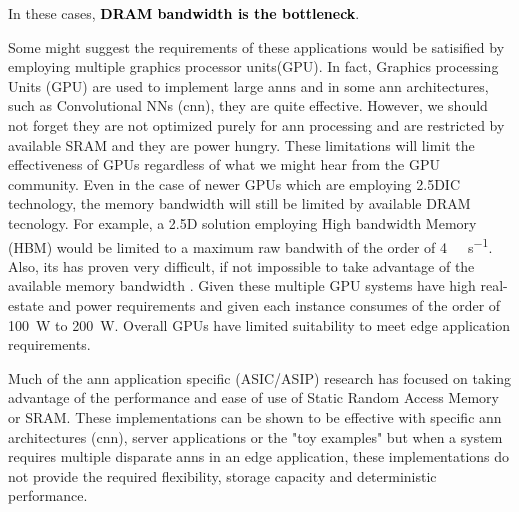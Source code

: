 In these cases, \textbf{\textcolor{black}{DRAM bandwidth is the bottleneck}}.




\iffalse
So considering the performance improvements observed in other applications, it is expected that many customer facing or edge applications will implement multiple instances of artificial neural networks to perform various functions.
have very large memory and processing requirements.
require multiple instances of \ac{ann}s of similar size to the \ac{ann} described in \cite{krizhevsky2012imagenet}.

For example employing multiple cameras or monitoring and controlling different systems in a drone, a automobile each with an image recognition \ac{ann}\cite{krizhevsky2012imagenet}\cite{bojarski2016end} for navigation, engine monitoring along with other system control.
\fi

Some might suggest the requirements of these applications would be satisified by employing multiple graphics processor units(GPU).
In fact, Graphics processing Units (GPU) are used to implement large \ac{ann}s and in some \ac{ann} architectures, such as Convolutional NNs (\ac{cnn}), they are quite effective. However, we should not forget they are not optimized purely for \ac{ann} processing and are restricted by available SRAM and they are power hungry. These limitations will limit the effectiveness of GPUs regardless of what we might hear from the GPU community.
Even in the case of newer GPUs which are employing 2.5DIC technology, the memory bandwidth will still be limited by available DRAM tecnology.
For example, a 2.5D solution employing High bandwidth Memory (HBM) would be limited to a maximum raw bandwith of the order of \SI[per-mode=symbol]{4}{\tera \bit \per \second}.
Also, its has proven very difficult, if not impossible to take advantage of the available memory bandwidth \cite{farabet2011neuflow} \cite{tensorflow2015-whitepaper}.
Given these multiple GPU systems have high real-estate and power requirements and given each instance consumes of the order of \SI{100}{\watt} to \SI{200}{\watt}.
Overall GPUs have limited suitability to meet edge application requirements.


Much of the \ac{ann} application specific (ASIC/ASIP) research has focused on taking advantage of the performance and ease of use of Static Random Access Memory or SRAM. These implementations can be shown to be effective with specific \ac{ann} architectures (\ac{cnn}), server applications or the "toy examples" but when a system requires multiple disparate \ac{ann}s in an edge application, these implementations do not provide the required flexibility, storage capacity and deterministic performance.


